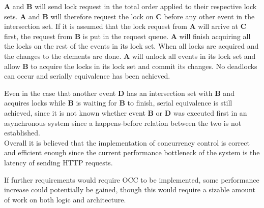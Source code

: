 \textbf{A} and \textbf{B} will send lock request in the total order applied to their respective lock sets. \textbf{A} and \textbf{B} will therefore request the lock on \textbf{C} before any other event in the intersection set. If it is assumed that the lock request from \textbf{A} will arrive at \textbf{C} first, the request from \textbf{B} is put in the request queue. \textbf{A} will finish acquiring all the locks on the rest of the events in its lock set. When all locks are acquired and the changes to the elements are done. \textbf{A} will unlock all events in its lock set and allow \textbf{B} to acquire the locks in its lock set and commit its changes. No deadlocks can occur and serially equivalence has been achieved. 

Even in the case that another event \textbf{D} has an intersection set with \textbf{B} and acquires locks while \textbf{B} is waiting for \textbf{B} to finish, serial equivalence is still achieved, since it is not known whether event \textbf{B} or \textbf{D} was executed first in an asynchronous system since a happens-before relation between the two is not established. \\

Overall it is believed that the implementation of concurrency control is correct and efficient enough since the current performance bottleneck of the system is the latency of sending HTTP requests.

If further requirements would require OCC to be implemented, some performance increase could potentially be gained, though this would require a sizable amount of work on both logic and architecture.
